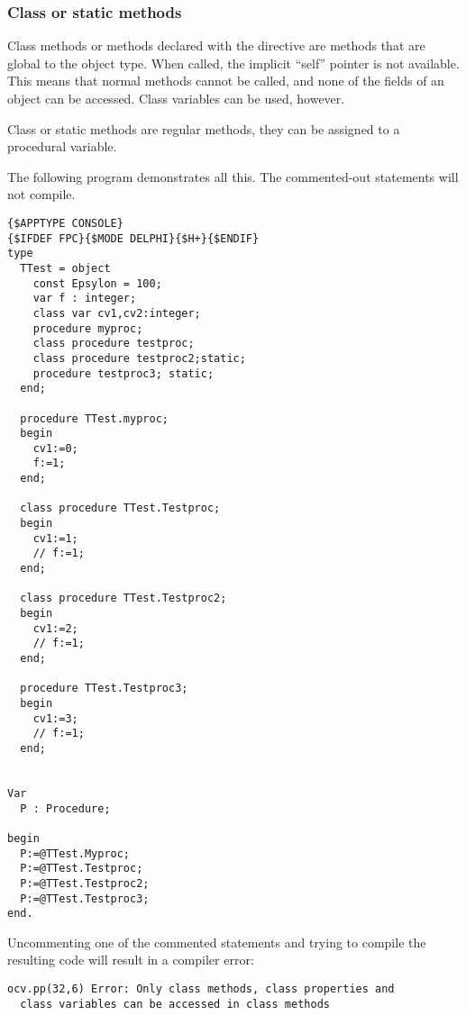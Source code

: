 \subsubsection{Class or static methods}
Class methods or methods declared with the  directive are
methods that are global to the object type. When called, the implicit
``self'' pointer is not available. This means that normal methods cannot
be called, and none of the fields of an object can be accessed.
Class variables can be used, however.

Class or static methods are regular methods, they can be assigned to a procedural variable.

The following program demonstrates all this. The commented-out statements will not compile.
\begin{verbatim}
{$APPTYPE CONSOLE}
{$IFDEF FPC}{$MODE DELPHI}{$H+}{$ENDIF}
type
  TTest = object
    const Epsylon = 100;
    var f : integer;
    class var cv1,cv2:integer;
    procedure myproc;
    class procedure testproc;
    class procedure testproc2;static;
    procedure testproc3; static;
  end;

  procedure TTest.myproc;
  begin
    cv1:=0;
    f:=1;
  end;

  class procedure TTest.Testproc;
  begin
    cv1:=1;
    // f:=1;
  end;

  class procedure TTest.Testproc2;
  begin
    cv1:=2;
    // f:=1;
  end;

  procedure TTest.Testproc3;
  begin
    cv1:=3;
    // f:=1;
  end;


Var
  P : Procedure;

begin
  P:=@TTest.Myproc;
  P:=@TTest.Testproc;
  P:=@TTest.Testproc2;
  P:=@TTest.Testproc3;
end.
\end{verbatim}
Uncommenting one of the commented statements and trying to compile the resulting code will result in a compiler error:
\begin{verbatim}
ocv.pp(32,6) Error: Only class methods, class properties and
  class variables can be accessed in class methods
\end{verbatim}

